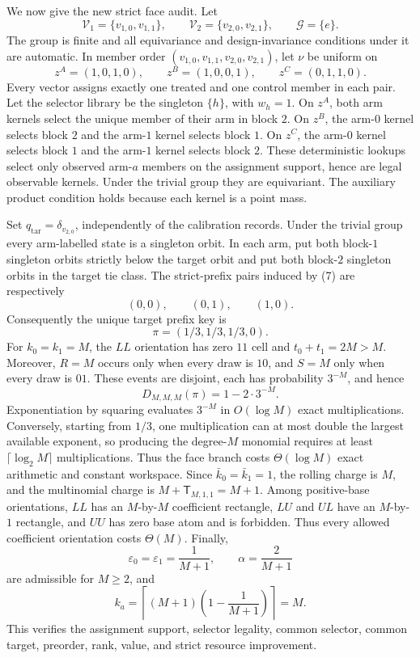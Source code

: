 We now give the new strict face audit. Let
\[
\mathcal V_1=\{v_{1,0},v_{1,1}\},\qquad
\mathcal V_2=\{v_{2,0},v_{2,1}\},\qquad
\mathcal G=\{e\}.
\]
The group is finite and all equivariance and design-invariance conditions under it are automatic. In member order
\((v_{1,0},v_{1,1},v_{2,0},v_{2,1})\), let \(\nu\) be uniform on
\[
z^A=(1,0,1,0),\qquad
z^B=(1,0,0,1),\qquad
z^C=(0,1,1,0).
\tag{7}
\]
Every vector assigns exactly one treated and one control member in each pair. Let the selector library be the singleton \(\{h\}\), with \(w_h=1\). On \(z^A\), both arm kernels select the unique member of their arm in block \(2\). On \(z^B\), the arm-\(0\) kernel selects block \(2\) and the arm-\(1\) kernel selects block \(1\). On \(z^C\), the arm-\(0\) kernel selects block \(1\) and the arm-\(1\) kernel selects block \(2\). These deterministic lookups select only observed arm-\(a\) members on the assignment support, hence are legal observable kernels. Under the trivial group they are equivariant. The auxiliary product condition holds because each kernel is a point mass.

Set \(q_{\mathrm{tar}}=\delta_{v_{2,0}}\), independently of the calibration records. Under the trivial group every arm-labelled state is a singleton orbit. In each arm, put both block-\(1\) singleton orbits strictly below the target orbit and put both block-\(2\) singleton orbits in the target tie class. The strict-prefix pairs induced by (7) are respectively
\[
(0,0),\qquad(0,1),\qquad(1,0).
\]
Consequently the unique target prefix key is
\[
\pi=(1/3,1/3,1/3,0).
\tag{8}
\]
For \(k_0=k_1=M\), the \(LL\) orientation has zero \(11\) cell and
\(t_0+t_1=2M>M\). Moreover, \(R=M\) occurs only when every draw is \(10\), and \(S=M\) only when every draw is \(01\). These events are disjoint, each has probability \(3^{-M}\), and hence
\[
D_{M,M,M}(\pi)=1-2\cdot3^{-M}.
\tag{9}
\]
Exponentiation by squaring evaluates \(3^{-M}\) in \(O(\log M)\) exact multiplications. Conversely, starting from \(1/3\), one multiplication can at most double the largest available exponent, so producing the degree-\(M\) monomial requires at least \(\lceil\log_2 M\rceil\) multiplications. Thus the face branch costs
\(\Theta(\log M)\) exact arithmetic and constant workspace. Since
\(\bar k_0=\bar k_1=1\), the rolling charge is \(M\), and the multinomial charge is \(M+\mathsf T_{M,1,1}=M+1\). Among positive-base orientations, \(LL\) has an \(M\)-by-\(M\) coefficient rectangle, \(LU\) and \(UL\) have an \(M\)-by-\(1\) rectangle, and \(UU\) has zero base atom and is forbidden. Thus every allowed coefficient orientation costs \(\Theta(M)\). Finally,
\[
\varepsilon_0=\varepsilon_1=\frac1{M+1},\qquad
\alpha=\frac2{M+1}
\]
are admissible for \(M\ge2\), and
\[
k_a=\left\lceil(M+1)\left(1-\frac1{M+1}\right)\right\rceil=M.
\]
This verifies the assignment support, selector legality, common selector, common target, preorder, rank, value, and strict resource improvement.

